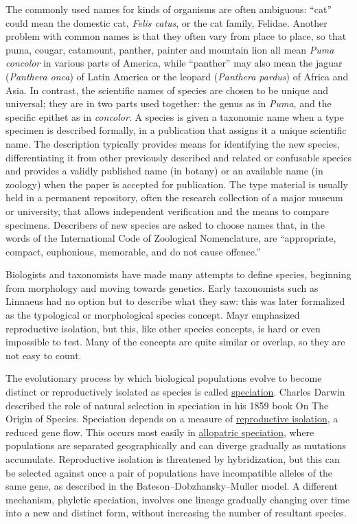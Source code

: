 The commonly used names for kinds of organisms are often ambiguous:
``cat'' could mean the domestic cat, \emph{Felis catus}, or the cat family,
Felidae. Another problem with common names is that they often vary from
place to place, so that puma, cougar, catamount, panther, painter and
mountain lion all mean \emph{Puma concolor} in various parts of America, while
``panther'' may also mean the jaguar (\emph{Panthera onca}) of Latin America or
the leopard (\emph{Panthera pardus}) of Africa and Asia. In contrast, the
scientific names of species are chosen to be unique and universal; they
are in two parts used together: the genus as in \emph{Puma}, and the specific
epithet as in \emph{concolor}. A species is given a taxonomic name when a type
specimen is described formally, in a publication that assigns it a
unique scientific name. The description typically provides means for
identifying the new species, differentiating it from other previously
described and related or confusable species and provides a validly
published name (in botany) or an available name (in zoology) when the
paper is accepted for publication. The type material is usually held in
a permanent repository, often the research collection of a major museum
or university, that allows independent verification and the means to
compare specimens. Describers of new species are asked to choose names
that, in the words of the International Code of Zoological Nomenclature,
are ``appropriate, compact, euphonious, memorable, and do not cause
offence.''

Biologists and taxonomists have made many attempts to define species,
beginning from morphology and moving towards genetics. Early taxonomists
such as Linnaeus had no option but to describe what they saw: this was
later formalized as the typological or morphological species concept.
Mayr emphasized reproductive isolation, but this, like other species
concepts, is hard or even impossible to test. Many of the concepts are
quite similar or overlap, so they are not easy to count.

The evolutionary process by which biological populations evolve to
become distinct or reproductively isolated as species is called
\href{https://en.wikipedia.org/wiki/Speciation}{speciation}. Charles Darwin described the role of natural selection in
speciation in his 1859 book On The Origin of Species. Speciation depends on
a measure of \href{https://en.wikipedia.org/wiki/Reproductive_isolation}{reproductive isolation}, a reduced gene flow. This occurs
most easily in \href{https://en.wikipedia.org/wiki/Allopatric_speciation}{allopatric speciation}, where populations are separated
geographically and can diverge gradually as mutations accumulate.
Reproductive isolation is threatened by hybridization, but this can be
selected against once a pair of populations have incompatible alleles of
the same gene, as described in the Bateson--Dobzhansky--Muller model. A
different mechanism, phyletic speciation, involves one lineage gradually
changing over time into a new and distinct form, without increasing the
number of resultant species.

